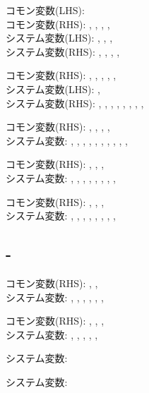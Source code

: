 \begin{hosoku}\small
コモン変数(LHS): \\
コモン変数(RHS): , , , , \\
システム変数(LHS): , , , \\
システム変数(RHS): , , , , 
\end{hosoku}

\begin{hosoku}\small
コモン変数(RHS): , , , , , \\
システム変数(LHS): , \\
システム変数(RHS): , , , , , , , , 
\end{hosoku}

\begin{hosoku}\small
コモン変数(RHS): , , , , \\
システム変数: , , , , , , , , , , 
\end{hosoku}

\begin{hosoku}\small
コモン変数(RHS): , , , \\
システム変数: , , , , , , , , 
\end{hosoku}

\begin{hosoku}\small
コモン変数(RHS): , , , \\
システム変数: , , , , , , , , 
\end{hosoku}

\subsection{-}
\begin{hosoku}\small
コモン変数(RHS): , , \\
システム変数: , , , , , , 
\end{hosoku}

\begin{hosoku}\small
コモン変数(RHS): , , , \\
システム変数: , , , , , 
\end{hosoku}

\begin{hosoku}\small
システム変数: 
\end{hosoku}

\begin{hosoku}\small
システム変数: 
\end{hosoku}
